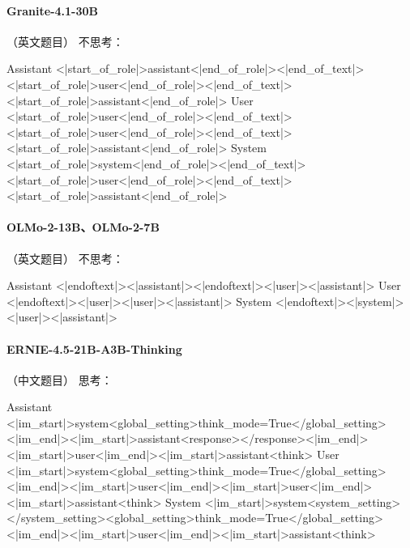 \paragraph{Granite-4.1-30B} （英文题目）
\noindent 不思考：
\begin{Rendering}
Assistant  <|start_of_role|>assistant<|end_of_role|><|end_of_text|>\NL{}<|start_of_role|>user<|end_of_role|><|end_of_text|>\NL{}<|start_of_role|>assistant<|end_of_role|>
User       <|start_of_role|>user<|end_of_role|><|end_of_text|>\NL{}<|start_of_role|>user<|end_of_role|><|end_of_text|>\NL{}<|start_of_role|>assistant<|end_of_role|>
System     <|start_of_role|>system<|end_of_role|><|end_of_text|>\NL{}<|start_of_role|>user<|end_of_role|><|end_of_text|>\NL{}<|start_of_role|>assistant<|end_of_role|>
\end{Rendering}
\paragraph{OLMo-2-13B、OLMo-2-7B} （英文题目）
\noindent 不思考：
\begin{Rendering}
Assistant  <|endoftext|><|assistant|>\NL{}<|endoftext|>\NL{}<|user|>\NL{}\NL{}<|assistant|>\NL{}
User       <|endoftext|><|user|>\NL{}\NL{}<|user|>\NL{}\NL{}<|assistant|>\NL{}
System     <|endoftext|><|system|>\NL{}\NL{}<|user|>\NL{}\NL{}<|assistant|>\NL{}
\end{Rendering}
\paragraph{ERNIE-4.5-21B-A3B-Thinking} （中文题目）
\noindent 思考：
\begin{Rendering}
Assistant  <|im_start|>system\NL{}<global_setting>\NL{}think_mode=True\NL{}</global_setting><|im_end|>\NL{}\NL{}<|im_start|>assistant\NL{}<response>\NL{}\NL{}</response>\NL{}<|im_end|>\NL{}\NL{}<|im_start|>user\NL{}<|im_end|>\NL{}\NL{}<|im_start|>assistant\NL{}<think>\NL{}
User       <|im_start|>system\NL{}<global_setting>\NL{}think_mode=True\NL{}</global_setting><|im_end|>\NL{}\NL{}<|im_start|>user\NL{}<|im_end|>\NL{}\NL{}<|im_start|>user\NL{}<|im_end|>\NL{}\NL{}<|im_start|>assistant\NL{}<think>\NL{}
System     <|im_start|>system\NL{}<system_setting>\NL{}\NL{}</system_setting>\NL{}\NL{}<global_setting>\NL{}think_mode=True\NL{}</global_setting><|im_end|>\NL{}\NL{}<|im_start|>user\NL{}<|im_end|>\NL{}\NL{}<|im_start|>assistant\NL{}<think>\NL{}
\end{Rendering}
